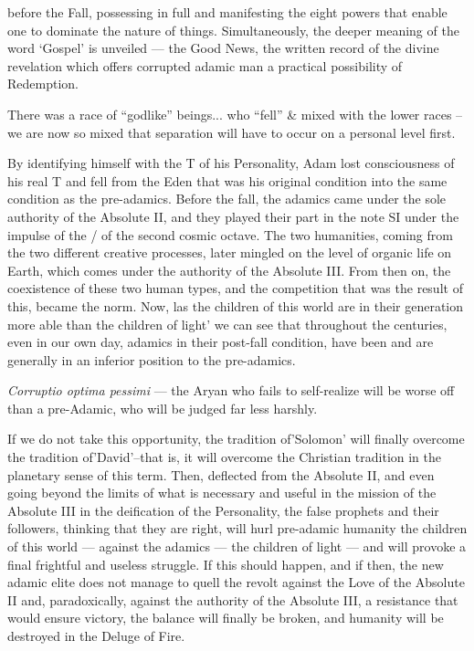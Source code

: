 \begin{quotex}
before the Fall, possessing in full and manifesting the eight powers that enable one to dominate the nature of things. Simultaneously, the deeper meaning of the word `Gospel' is unveiled --- the Good News, the written record of the divine revelation which offers corrupted adamic man a practical possibility of Redemption.
\end{quotex}


There was a race of ``godlike'' beings... who ``fell'' \& mixed with the lower races -- we are now so mixed that separation will have to occur on a personal level first.

\begin{quotex}
By identifying himself with the T of his Personality, Adam lost consciousness of his real T and fell from the Eden that was his original condition into the same condition as the pre-adamics. Before the fall, the adamics came under the sole authority of the Absolute II, and they played their part in the note SI under the impulse of the / of the second cosmic octave. The two humanities, coming from the two different creative processes, later mingled on the level of organic life on Earth, which comes under the authority of the Absolute III. From then on, the coexistence of these two human types, and the competition that was the result of this, became the norm. Now, las the children of this world are in their generation more able than the children of light' we can see that throughout the centuries, even in our own day, adamics in their post-fall condition, have been and are generally in an inferior position to the pre-adamics.
\end{quotex}


\emph{Corruptio optima pessimi} --- the Aryan who fails to self-realize will be worse off than a pre-Adamic, who will be judged far less harshly.

\begin{quotex}
If we do not take this opportunity, the tradition of'Solomon' will finally overcome the tradition of'David'--that is, it will overcome the Christian tradition in the planetary sense of this term. Then, deflected from the Absolute II, and even going beyond the limits of what is necessary and useful in the mission of the Absolute III in the deification of the Personality, the false prophets and their followers, thinking that they are right, will hurl pre-adamic humanity the children of this world --- against the adamics --- the children of light --- and will provoke a final frightful and useless struggle. If this should happen, and if then, the new adamic elite does not manage to quell the revolt against the Love of the Absolute II and, paradoxically, against the authority of the Absolute III, a resistance that would ensure victory, the balance will finally be broken, and humanity will be destroyed in the Deluge of Fire.
\end{quotex}


